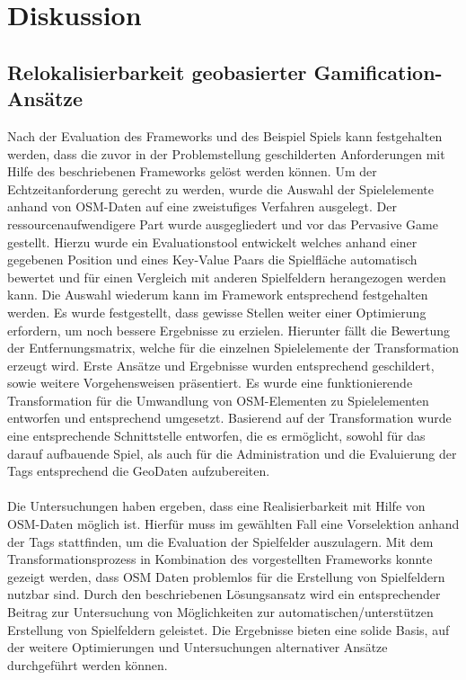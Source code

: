 \chapter{Diskussion}
\label{sec:S7_Diskussion}

\section{Relokalisierbarkeit geobasierter Gamification-Ansätze}

Nach der Evaluation des Frameworks und des Beispiel Spiels kann festgehalten werden, dass die zuvor in der Problemstellung geschilderten Anforderungen mit Hilfe des beschriebenen Frameworks gelöst werden können. Um der Echtzeitanforderung gerecht zu werden, wurde die Auswahl der Spielelemente anhand von OSM-Daten auf eine zweistufiges Verfahren ausgelegt. Der ressourcenaufwendigere Part wurde ausgegliedert und vor das Pervasive Game gestellt. Hierzu wurde ein Evaluationstool entwickelt welches anhand einer gegebenen Position und eines Key-Value Paars die Spielfläche automatisch bewertet und für einen Vergleich mit anderen Spielfeldern herangezogen werden kann.
Die Auswahl wiederum kann im Framework entsprechend festgehalten werden. Es wurde festgestellt, dass gewisse Stellen weiter einer Optimierung erfordern, um noch bessere Ergebnisse zu erzielen.
Hierunter fällt die Bewertung der Entfernungsmatrix, welche für die einzelnen Spielelemente der Transformation erzeugt wird. Erste Ansätze und Ergebnisse wurden entsprechend geschildert, sowie weitere Vorgehensweisen präsentiert.
Es wurde eine funktionierende Transformation für die Umwandlung von OSM-Elementen zu Spielelementen entworfen und entsprechend umgesetzt.
Basierend auf der Transformation wurde eine entsprechende Schnittstelle entworfen, die es ermöglicht, sowohl für das darauf aufbauende Spiel, als auch für die Administration und die Evaluierung der Tags entsprechend die GeoDaten aufzubereiten.
\\\\
Die Untersuchungen haben ergeben, dass eine Realisierbarkeit mit Hilfe von OSM-Daten möglich ist. Hierfür muss im gewählten Fall eine Vorselektion anhand der Tags stattfinden, um die Evaluation der Spielfelder auszulagern. Mit dem Transformationsprozess in Kombination des vorgestellten Frameworks konnte gezeigt werden, dass OSM Daten problemlos für die Erstellung von Spielfeldern nutzbar sind. Durch den beschriebenen Lösungsansatz wird ein entsprechender Beitrag zur Untersuchung von Möglichkeiten zur automatischen/unterstützen Erstellung von Spielfeldern geleistet. Die Ergebnisse bieten eine solide Basis, auf der weitere Optimierungen  und Untersuchungen alternativer Ansätze durchgeführt werden können.

